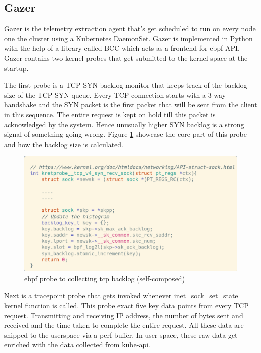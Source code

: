 \subsection{Gazer}

Gazer is the telemetry extraction agent that's get scheduled to run on every node one the cluster using a Kubernetes DaemonSet. Gazer is implemented in Python with the help of a library called BCC which acts as a frontend for \ac{ebpf} API. Gazer contains two kernel probes that get submitted to the kernel space at the startup. 

The first probe is a TCP SYN backlog monitor that keeps track of the backlog size of the TCP SYN queue. Every TCP connection starts with a 3-way handshake and the SYN packet is the first packet that will be sent from the client in this sequence. The entire request is kept on hold till this packet is acknowledged by the system. Hence unusually higher SYN backlog is a strong signal of something going wrong. Figure \ref{fig:backlog-probe} showcase the core part of this probe and how the backlog size is calculated.

\begin{figure}[H]
    \includegraphics[width=14cm]{assets/implementation/backlog-probe.png}
    \caption{\ac{ebpf} probe to collecting tcp backlog (self-composed)}
    \label{fig:backlog-probe}
\end{figure}

Next is a tracepoint probe that gets invoked whenever inet\_sock\_set\_state kernel function is called. This probe exact five key data points from every TCP request. Transmitting and receiving IP address, the number of bytes sent and received and the time taken to complete the entire request. All these data are shipped to the userspace via a perf buffer. In user space, these raw data get enriched with the data collected from kube-api. 

